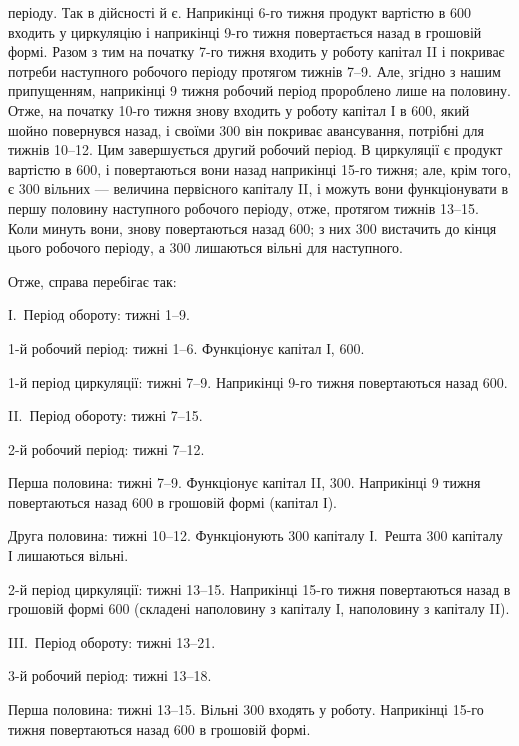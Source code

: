 \parcont{}  %
періоду. Так в дійсності й є. Наприкінці 6-го тижня продукт вартістю
в 600 входить у циркуляцію і наприкінці 9-го тижня повертається
назад в грошовій формі. Разом з тим на початку 7-го тижня
входить у роботу капітал II і покриває потреби наступного робочого
періоду протягом тижнів 7--9. Але, згідно з нашим припущенням, наприкінці
9 тижня робочий період пророблено лише на половину. Отже, на
початку 10-го тижня знову входить у роботу капітал І в 600,
який шойно повернувся назад, і своїми 300 він покриває авансування,
потрібні для тижнів 10--12. Цим завершується другий робочий
період. В циркуляції є продукт вартістю в 600, і повертаються
вони назад наприкінці 15-го тижня; але, крім того, є 300
вільних — величина первісного капіталу II, і можуть вони функціонувати
в першу половину наступного робочого періоду, отже, протягом тижнів
13--15. Коли минуть вони, знову повертаються назад 600;
з них 300 вистачить до кінця цього робочого періоду, а
300 лишаються вільні для наступного.

Отже, справа перебігає так:

І.~Період обороту: тижні 1--9.

1-й робочий період: тижні 1--6. Функціонує капітал І, 600.

1-й період циркуляції: тижні 7--9. Наприкінці 9-го тижня повертаються
назад 600.

II.~Період обороту: тижні 7--15.

2-й робочий період: тижні 7--12.

Перша половина: тижні 7--9. Функціонує капітал II, 300.
Наприкінці 9 тижня повертаються назад 600 в грошовій формі
(капітал І).

Друга половина: тижні 10--12. Функціонують 300 капіталу
І.~Решта 300 капіталу І лишаються вільні.

2-й період циркуляції: тижні 13--15. Наприкінці 15-го тижня повертаються
назад в грошовій формі 600 (складені наполовину
з капіталу І, наполовину з капіталу II).

III.~Період обороту: тижні 13--21.

3-й робочий період: тижні 13--18.

Перша половина: тижні 13--15. Вільні 300 входять у
роботу. Наприкінці 15-го тижня повертаються назад 600 в грошовій
формі.

